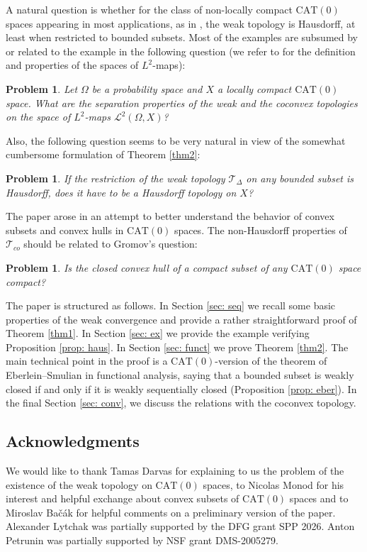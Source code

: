 \documentclass[12pt,leqno]{amsart}
\numberwithin{equation}{section}
\newtheorem{quest}[thm]{Problem}
\theoremstyle{remark}
\newcommand{\CAT}{\mathrm{CAT}}
\begin{document}
A natural question is whether for the class of non-locally compact $\CAT(0)$ spaces appearing in most applications, as in \cite{Monod,Streets,Darvas,Clarke,Clarke2}, the weak topology is Hausdorff, at least when restricted to bounded subsets. Most of the examples are subsumed by or related to the example in the following question (we refer to \cite{Monod} for the definition and properties of the spaces of $L^2$-maps):

\begin{quest}
	Let $\Omega$ be a probability space and $X$ a locally compact $\CAT(0)$ space. What are the separation properties of the weak and the coconvex topologies on the space of $L^2$-maps $\mathcal L^2 (\Omega, X)$?
\end{quest}

Also, the following question seems to be very natural in view of the somewhat cumbersome formulation of Theorem \ref{thm2}:

\begin{quest}
	If the restriction of the weak topology $\mathcal T_{\Delta}$ on any bounded subset is Hausdorff, does it have to be a Hausdorff topology on $X$?
\end{quest} 

The paper arose in an attempt to better understand the behavior of convex subsets and convex hulls in $\CAT(0)$ spaces. The non-Hausdorff properties of $\mathcal T_{co}$ should be related to Gromov's question:

\begin{quest}
Is the closed convex hull of a compact subset of any $\CAT(0)$ space compact?
\end{quest}

The paper is structured as follows. In Section \ref{sec: seq} we recall some basic properties of the weak convergence and provide a rather straightforward proof of Theorem \ref{thm1}. In Section \ref{sec: ex} we provide the example verifying Proposition \ref{prop: haus}.
In Section \ref{sec: funct} we prove Theorem \ref{thm2}. The main technical point in the proof is a $\CAT(0)$-version of the theorem of Eberlein--Smulian in functional analysis, saying that a bounded subset is weakly closed if and only if it is weakly sequentially closed (Proposition \ref{prop: eber}).
In the final Section \ref{sec: conv}, we discuss the relations with the coconvex topology. 

\subsection*{Acknowledgments}
We would like to thank Tamas Darvas for explaining to us the problem of the existence of the weak topology on 
$\CAT(0)$ spaces, to Nicolas Monod for his interest and helpful exchange about convex subsets of $\CAT (0)$ spaces and to Miroslav Bačák for helpful comments on a preliminary version of the paper. 
Alexander Lytchak was partially supported by the DFG grant SPP 2026.
Anton Petrunin was partially supported by NSF grant DMS-2005279.
\end{document}

